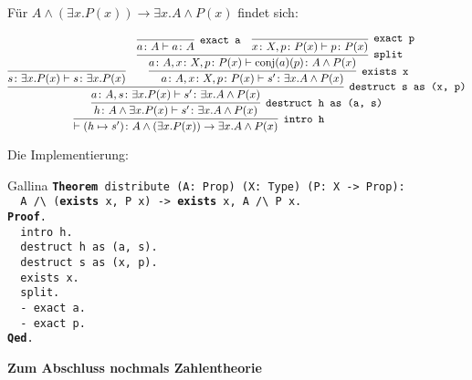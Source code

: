 \documentclass[8pt]{beamer}
\newcommand{\strong}[1]{\textsf{\textbf{#1}}}
\newcommand{\centerheadline}[1]{%
  \begin{center}\strong{#1}\end{center}}
\newcommand{\kw}[1]{\textbf{#1}}
\begin{document}
\begin{frame}
Für $A\land (\exists x. P(x))\to\exists x. A\land P(x)$ findet sich:\pause
\begin{small}
\[
\infer[\texttt{intro h}]{\vdash (h\mapsto s')\colon A\land (\exists x. P(x))\to\exists x. A\land P(x)}{
  \infer[\texttt{destruct h as (a, s)}]{h\colon A\land\exists x. P(x)\vdash s'\colon\exists x. A\land P(x)}{
    \infer[\texttt{destruct s as (x, p)}]{a\colon A,s\colon\exists x.P(x)\vdash s'\colon\exists x.A\land P(x)}{
      \infer{s\colon\exists x.P(x)\vdash s\colon\exists x.P(x)}{}
    & \infer[\texttt{exists x}]{a\colon A,x\colon X,p\colon P(x)\vdash s'\colon\exists x.A\land P(x)}{
        \infer[\texttt{split}]{a\colon A,x\colon X,p\colon P(x)\vdash \mathrm{conj}(a)(p)\colon A\land P(x)}{
          \infer[\texttt{exact a}]{a\colon A\vdash a\colon A}{}
        & \infer[\texttt{exact p}]{x\colon X,p\colon P(x)\vdash p\colon P(x)}{}}}}}}
\]
\end{small}\pause
Die Implementierung:
\begin{block}{Gallina}
\texttt{\kw{Theorem} distribute (A: Prop) (X: Type) (P: X -> Prop):\\
\ \ A /{\textbackslash} (\kw{exists} x, P x) -> \kw{exists} x, A /{\textbackslash} P x.\\
\kw{Proof}.\\
\ \ intro h.\\
\ \ destruct h as (a, s).\\
\ \ destruct s as (x, p).\\
\ \ exists x.\\
\ \ split.\\
\ \ - exact a.\\
\ \ - exact p.\\
\kw{Qed}.}
\end{block}
\end{frame}

\begin{frame}
\centerheadline{Zum Abschluss nochmals Zahlentheorie}
\end{frame}
\end{document}
